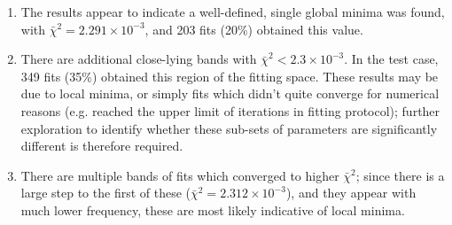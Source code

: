 \documentclass[10pt]{article}
\begin{document}
\begin{enumerate}
\item The results appear to indicate a well-defined, single global minima was found, with $\bar{\chi}^2 = 2.291\times10^{-3}$, and 203 fits (20\%) obtained this value.
\item There are additional close-lying bands with $\bar{\chi}^2 < 2.3\times10^{-3}$. In the test case, 349 fits (35\%) obtained this region of the fitting space. These results may be due to local minima, or simply fits which didn't quite converge for numerical reasons (e.g. reached the upper limit of iterations in fitting protocol); further exploration to identify whether these sub-sets of parameters are significantly different is therefore required.
\item There are multiple bands of fits which converged to higher $\bar{\chi}^2$; since there is a large step to the first of these ($\bar{\chi}^2 = 2.312\times10^{-3}$), and they appear with much lower frequency, these are most likely indicative of local minima.

\end{enumerate}
\end{document}
